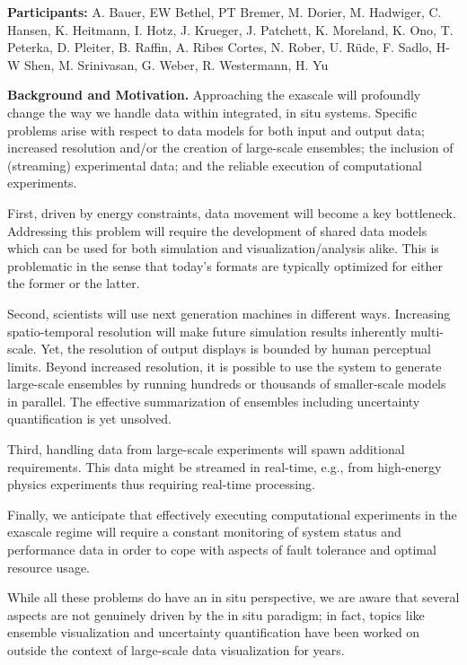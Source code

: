 \license

\textbf{\sffamily Participants:} A. Bauer, EW Bethel, PT Bremer, M. Dorier, M. Hadwiger, C. Hansen, K. Heitmann, I. Hotz, J. Krueger, J. Patchett, K. Moreland, K. Ono, T. Peterka, D. Pleiter, B. Raffin, A. Ribes Cortes, N. Rober, U. R\"ude, F. Sadlo, H-W Shen, M. Srinivasan, G. Weber, R. Westermann, H. Yu

\medskip\noindent
\textbf{\sffamily Background and Motivation.}
Approaching the exascale will profoundly change the way we handle data within integrated, in situ systems. 
Specific problems arise with respect to data models for both input and output data; increased resolution and/or the creation of large-scale ensembles; the inclusion of (streaming) experimental data; and the reliable execution of computational experiments.

First, driven by energy constraints, data movement will become a key bottleneck. 
Addressing this problem will require the development of shared data models which can be used for both simulation and visualization/analysis alike. 
This is problematic in the sense that today’s formats are typically optimized for either the former or the latter. 

Second, scientists will use next generation machines in different ways. 
Increasing spatio-temporal resolution will make future simulation results inherently multi-scale. 
Yet, the resolution of output displays is bounded by human perceptual limits.
Beyond increased resolution, it is possible to use the system to generate large-scale ensembles by running hundreds or thousands of smaller-scale models in parallel. 
The effective summarization of ensembles including uncertainty quantification is yet unsolved. 

Third, handling data from large-scale experiments will spawn additional requirements. 
This data might be streamed in real-time, e.g., from high-energy physics experiments thus requiring real-time processing. 

Finally, we anticipate that effectively executing computational experiments in the exascale regime will require a constant monitoring of system status and performance data in order to cope with aspects of fault tolerance and optimal resource usage.

While all these problems do have an in situ perspective, we are aware that several aspects are not genuinely driven by the in situ paradigm; in fact, topics like ensemble visualization and uncertainty quantification have been worked on outside the context of large-scale data visualization for years.

